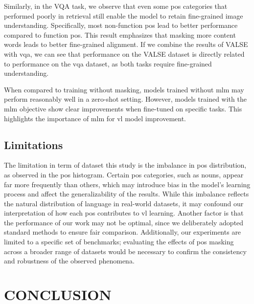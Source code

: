 Similarly, in the VQA task, we observe that even some \acrshort{pos} categories that performed poorly in retrieval still enable the model to retain fine-grained image understanding.
Specifically, most non-function \acrshort{pos} lead to better performance compared to function \acrshort{pos}.
This result emphasizes that masking more content words leads to better fine-grained alignment.
If we combine the results of VALSE with \acrshort{vqa}, we can see that performance on the VALSE dataset is directly related to performance on the \acrshort{vqa} dataset, as both tasks require fine-grained understanding.

When compared to training without masking, models trained without \acrshort{mlm} may perform reasonably well in a zero-shot setting.
However, models trained with the \acrshort{mlm} objective show clear improvements when fine-tuned on specific tasks.
This highlights the importance of \acrshort{mlm} for \acrshort{vl} model improvement.

\section{Limitations}
The limitation in term of dataset this study is the imbalance in \acrshort{pos} distribution, as observed in the \acrshort{pos} histogram.
Certain \acrshort{pos} categories, such as nouns, appear far more frequently than others, which may introduce bias in the model’s learning process and affect the generalizability of the results.
While this imbalance reflects the natural distribution of language in real-world datasets, it may confound our interpretation of how each \acrshort{pos} contributes to \Acrshort{vl} learning.
Another factor is that the performance of our work may not be optimal, since we deliberately adopted standard methods to ensure fair comparison.
Additionally, our experiments are limited to a specific set of benchmarks; evaluating the effects of \acrshort{pos} masking across a broader range of datasets would be necessary to confirm the consistency and robustness of the observed phenomena.

\chapter{CONCLUSION}

